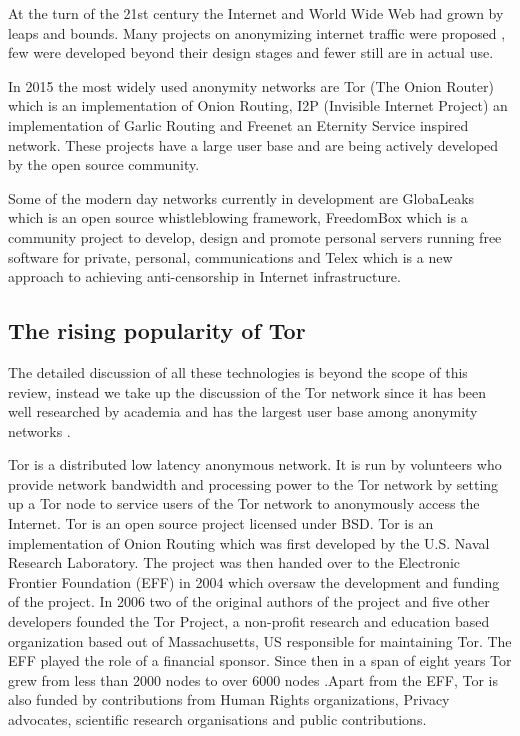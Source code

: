 \documentclass{llncs}
\begin{document}
At the turn of the 21st century the Internet and World Wide Web had grown by leaps and bounds. Many projects on anonymizing internet traffic were proposed \cite{goldberg97privacyenhancing} \cite{fiveyearslater}, few were developed beyond their design stages and fewer still are in actual use.

In 2015 the most widely used anonymity networks are Tor (The Onion Router) \cite{tor-design} which is an implementation of Onion Routing, I2P (Invisible Internet Project) \cite{delmer-mthesis} an implementation of Garlic Routing and Freenet \cite{freenet} an Eternity Service inspired network. These projects have a large user base and are being actively developed by the open source community.

Some of the modern day networks currently in development are GlobaLeaks \cite{globaleaks} which is an open source whistleblowing framework, FreedomBox \cite{freedom-box} which is a community project to develop, design and promote personal servers running free software for private, personal, communications and Telex \cite{telex11} which is a new approach to achieving anti-censorship in Internet infrastructure. 

\subsection{The rising popularity of Tor}
The detailed discussion of all these technologies is beyond the scope of this review, instead we take up the discussion of the Tor network since it has been well researched by academia and has the largest user base among anonymity networks \cite{tor-metrics}.

Tor is a distributed low latency anonymous network. It is run by volunteers who provide network bandwidth and processing power to the Tor network by setting up a Tor node to service users of the Tor network to anonymously access the Internet. Tor is an open source project licensed under BSD. Tor is an implementation of Onion Routing which was first developed by the U.S. Naval Research Laboratory. The project was then handed over to the Electronic Frontier Foundation (EFF) in 2004 which oversaw the development and funding of the project. In 2006 two of the original authors of the project and five other developers founded the Tor Project, a non-profit research and education based organization based out of Massachusetts, US responsible for maintaining Tor. The EFF played the role of a financial sponsor. Since then in a span of eight years Tor grew from less than 2000 nodes to over 6000 nodes \cite{tor-metrics}.Apart from the EFF, Tor is also funded by contributions from Human Rights organizations, Privacy advocates, scientific research organisations and public contributions.
 
\end{document}
